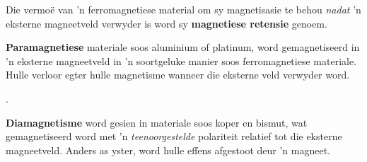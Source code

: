 Die vermo\"e van 'n ferromagnetiese material om sy magnetisasie te behou \textsl{nadat} 'n eksterne magneetveld verwyder is word sy \textbf{magnetiese retensie} genoem.\par
        
\textbf{Paramagnetiese} materiale soos aluminium of platinum, word gemagnetiseerd in 'n eksterne magneetveld in 'n soortgeluke manier soos ferromagnetiese materiale. Hulle verloor egter hulle magnetisme wanneer die eksterne veld verwyder word.\par. 
        
\textbf{Diamagnetisme} word gesien in materiale soos koper en bismut, wat gemagnetiseerd word met 'n \textsl{teenoorgestelde} polariteit relatief tot die eksterne magneetveld. Anders as yster, word hulle effens afgestoot deur 'n magneet. \par 


